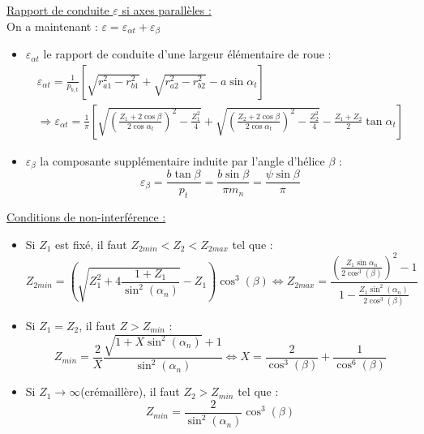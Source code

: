 \documentclass[../main.tex]{subfiles}
\begin{document}
\quad \underline{Rapport de conduite $\varepsilon$ si axes parallèles :}\\
On a maintenant : $\varepsilon = \varepsilon_{\alpha t} + \varepsilon_\beta$\\

\begin{itemize}
    \item $\varepsilon_{\alpha t}$ le rapport de conduite d'une largeur élémentaire de roue : \begin{equation}
    \begin{gathered}
        \varepsilon_{\alpha t} = \frac{1}{p_{b,t}}[\sqrt{r_{a1}^2-r_{b1}^2}+\sqrt{r_{a2}^2-r_{b2}^2}-a\sin{\alpha_t}]\\
        \Rightarrow \varepsilon_{\alpha t} = \frac{1}{\pi} [\sqrt{(\frac{Z_1+2\cos{\beta}}{2\cos{\alpha_t}})^2-\frac{Z_1^2}{4}}+\sqrt{(\frac{Z_2+2\cos{\beta}}{2\cos{\alpha_t}})^2-\frac{Z_2^2}{4}} - \frac{Z_1+Z_2}{2}\tan{\alpha_t}]
        \end{gathered}
    \end{equation}
    \item $\varepsilon_\beta$ la composante supplémentaire induite par l'angle d'hélice $\beta$ : \begin{equation}
        \varepsilon_\beta = \frac{b\tan{\beta}}{p_t} = \frac{b \sin{\beta}}{\pi m_n} = \frac{\psi \sin{\beta}}{\pi}
    \end{equation}
\end{itemize}


\quad \underline{Conditions de non-interférence :}\\
\begin{itemize}
    \item Si $Z_1$ est fixé, il faut $Z_{2min}<Z_2<Z_{2max}$ tel que : \begin{equation}
        Z_{2min} = (\sqrt{Z_1^2+4\frac{1+Z_1}{\sin^2(\alpha_n)}}-Z_1)\cos^3(\beta) \Leftrightarrow Z_{2max} = \frac{(\frac{Z_1 \sin{\alpha_n}}{2\cos^3(\beta)})^2-1}{1-\frac{Z_1\sin^2(\alpha_n)}{2\cos^3(\beta)}}
    \end{equation}
    \item Si $Z_1=Z_2$, il faut $Z>Z_{min}$ : \begin{equation}
        Z_{min} = \frac{2}{X} \frac{\sqrt{1+X \sin^2(\alpha_n)}+1}{\sin^2 (\alpha_n)} \Leftrightarrow X = \frac{2}{\cos^3(\beta)} + \frac{1}{\cos^6(\beta)}
    \end{equation}
    \item Si $Z_1 \rightarrow \infty$(crémaillère), il faut $Z_2>Z_{min}$ tel que :\begin{equation}
        Z_{min} = \frac{2}{\sin^2(\alpha_n)}\cos^3(\beta)
    \end{equation}
\end{itemize}
\end{document}
